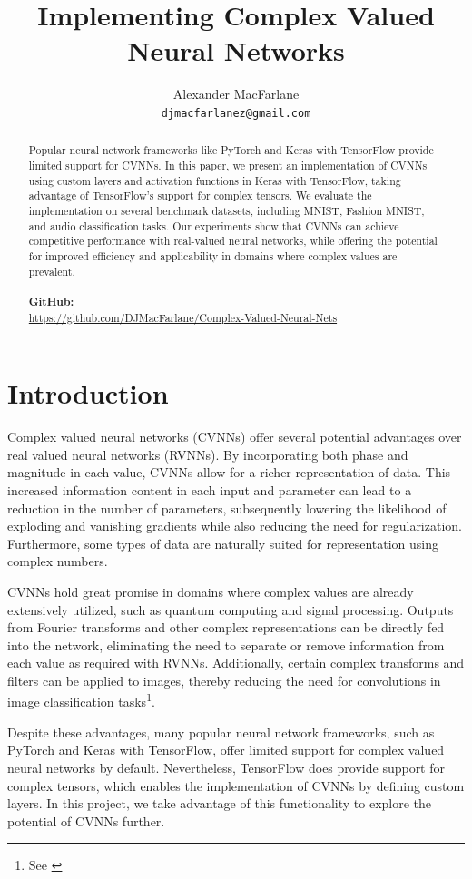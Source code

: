 \documentclass{article}
\title{Implementing Complex Valued Neural Networks}
\author{%
  Alexander MacFarlane\\
  \texttt{djmacfarlanez@gmail.com}
}
\begin{document}
\maketitle


\begin{abstract}
  Popular neural network frameworks like PyTorch and Keras with TensorFlow provide limited support for CVNNs. In this paper, we present an implementation of CVNNs using custom layers and activation functions in Keras with TensorFlow, taking advantage of TensorFlow's support for complex tensors. We evaluate the implementation on several benchmark datasets, including MNIST, Fashion MNIST, and audio classification tasks. Our experiments show that CVNNs can achieve competitive performance with real-valued neural networks, while offering the potential for improved efficiency and applicability in domains where complex values are prevalent. \\ \\
  \textbf{GitHub:}\\ \url{https://github.com/DJMacFarlane/Complex-Valued-Neural-Nets}
\end{abstract}
\section{Introduction}
Complex valued neural networks (CVNNs) offer several potential advantages over real valued neural networks (RVNNs). By incorporating both phase and magnitude in each value, CVNNs allow for a richer representation of data. This increased information content in each input and parameter can lead to a reduction in the number of parameters, subsequently lowering the likelihood of exploding and vanishing gradients while also reducing the need for regularization. Furthermore, some types of data are naturally suited for representation using complex numbers.

CVNNs hold great promise in domains where complex values are already extensively utilized, such as quantum computing and signal processing. Outputs from Fourier transforms and other complex representations can be directly fed into the network, eliminating the need to separate or remove information from each value as required with RVNNs. Additionally, certain complex transforms and filters can be applied to images, thereby reducing the need for convolutions in image classification tasks\footnote{See \cite{ko2022coshnet}}.

Despite these advantages, many popular neural network frameworks, such as PyTorch and Keras with TensorFlow, offer limited support for complex valued neural networks by default. Nevertheless, TensorFlow does provide support for complex tensors, which enables the implementation of CVNNs by defining custom layers. In this project, we take advantage of this functionality to explore the potential of CVNNs further.
\end{document}
